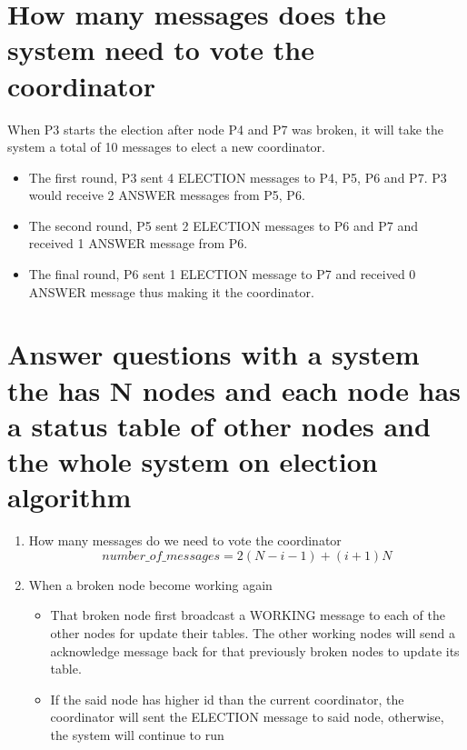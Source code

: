 \documentclass[11pt,a4paper]{report}
\begin{document}
\section{How many messages does the system need to vote the coordinator}
When P3 starts the election after node P4 and P7 was broken, it will take the system a total of 10 messages to elect a new coordinator.
\begin{itemize}
	\item The first round, P3 sent 4 ELECTION messages to P4, P5, P6 and P7. P3 would receive 2 ANSWER messages from P5, P6.
	\item The second round, P5 sent 2 ELECTION messages to P6 and P7 and received 1 ANSWER message from P6.
	\item The final round, P6 sent 1 ELECTION message to P7 and received 0 ANSWER message thus making it the coordinator.
\end{itemize}

\section{Answer questions with a system the has N nodes and each node has a status table of other nodes and the whole system on election algorithm}
\begin{enumerate}[label=\alph*)]
	\item How many messages do we need to vote the coordinator
	\[number\_of\_messages = 2(N-i-1) + (i+1)N\]
	\item When a broken node become working again
	\begin{itemize}
		\item That broken node first broadcast a WORKING message to each of the other nodes for update their tables. The other working nodes will send a acknowledge message back for that previously broken nodes to update its table.
		\item If the said node has higher id than the current coordinator, the coordinator will sent the ELECTION message to said node, otherwise, the system will continue to run
	\end{itemize}
\end{enumerate}
\end{document}
